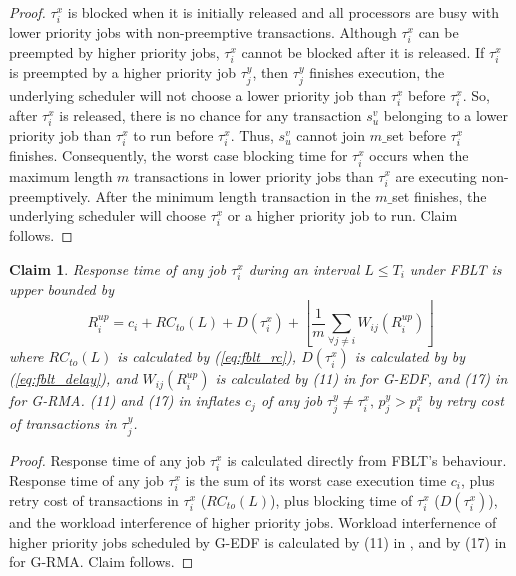 \documentclass[prodmode,acmtecs]{acmsmall}
\newtheorem{clm}{Claim}
\begin{document}
\begin{compactenum}
\begin{proof}

$\tau_{i}^{x}$ is blocked when it is initially released and all processors
are busy with lower priority jobs with non-preemptive transactions.
Although $\tau_{i}^{x}$ can be preempted by higher priority jobs,
$\tau_{i}^{x}$ cannot be blocked after it is released. If $\tau_{i}^{x}$
is preempted by a higher priority job $\tau_{j}^{y}$, then $\tau_{j}^{y}$
finishes execution, the underlying scheduler will not choose a lower
priority job than $\tau_{i}^{x}$ before $\tau_{i}^{x}$. So, after
$\tau_{i}^{x}$ is released, there is no chance for any transaction
$s_{u}^{v}$ belonging to a lower priority job than $\tau_{i}^{x}$
to run before $\tau_{i}^{x}$. Thus, $s_{u}^{v}$ cannot join $m\_$set
before $\tau_{i}^{x}$ finishes. Consequently, the worst case blocking
time for $\tau_{i}^{x}$ occurs when the maximum length $m$ transactions
in lower priority jobs than $\tau_{i}^{x}$ are executing non-preemptively.
After the minimum length transaction in the $m\_$set finishes, the
underlying scheduler will choose $\tau_{i}^{x}$ or a higher priority
job to run. Claim follows.

\end{proof}

\begin{clm}

Response time of any job $\tau_{i}^{x}$ during an interval $L\le T_{i}$
under FBLT is upper bounded by 
\begin{equation}
R_{i}^{up}=c_{i}+RC_{to}(L)+D(\tau_{i}^{x})+\left\lfloor \frac{1}{m}\sum_{\forall j\ne i}W_{ij}(R_{i}^{up})\right\rfloor \label{eq:fblt_res_time}
\end{equation}
where $RC_{to}(L)$ is calculated by (\ref{eq:fblt_rc}), $D(\tau_{i}^{x})$
is calculated by by (\ref{eq:fblt_delay}), and $W_{ij}(R_{i}^{up})$
is calculated by (11) in \cite{stmconcurrencycontrol:emsoft11} for
G-EDF, and (17) in \cite{stmconcurrencycontrol:emsoft11} for G-RMA.
(11) and (17) in \cite{stmconcurrencycontrol:emsoft11} inflates $c_{j}$
of any job $\tau_{j}^y\ne\tau_{i}^x,\, p_{j}^y>p_{i}^x$ by retry cost
of transactions in $\tau_{j}^y$.

\end{clm}

\begin{proof}

Response time of any job $\tau_i^x$ is calculated directly from FBLT's behaviour. Response time of any job $\tau_{i}^{x}$ is the sum of its
worst case execution time $c_{i}$, plus retry cost of transactions
in $\tau_{i}^{x}$ ($RC_{to}(L)$), plus blocking time of $\tau_{i}^{x}$
($D(\tau_{i}^{x})$), and the workload interference of higher priority
jobs. Workload interfernence of higher priority jobs scheduled by
G-EDF is calculated by (11) in \cite{stmconcurrencycontrol:emsoft11},
and by (17) in \cite{stmconcurrencycontrol:emsoft11} for G-RMA. Claim follows.


\end{proof}
\end{compactenum}
\end{document}
